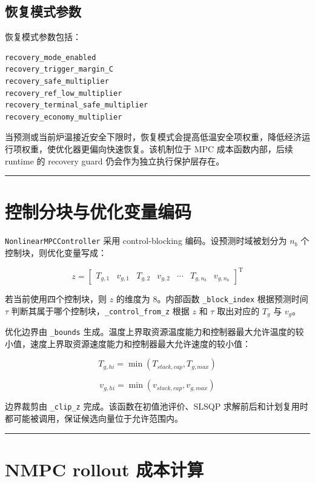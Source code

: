 \documentclass[UTF8,openany,zihao=-4,oneside]{ctexbook}
\providecommand{\passthrough}[1]{#1}
\newcommand{\manualdivider}{\par\vspace{0.6em}\noindent\textcolor{FGLine}{\rule{\linewidth}{0.7pt}}\vspace{0.6em}\par}
\begin{document}
\subsection{恢复模式参数}\label{subsec:nmpc-recovery-config}

恢复模式参数包括：

\begin{lstlisting}
recovery_mode_enabled
recovery_trigger_margin_C
recovery_safe_multiplier
recovery_ref_low_multiplier
recovery_terminal_safe_multiplier
recovery_economy_multiplier
\end{lstlisting}

当预测或当前炉温接近安全下限时，恢复模式会提高低温安全项权重，降低经济运行项权重，使优化器更偏向快速恢复。该机制位于 MPC 成本函数内部，后续 runtime 的 recovery guard 仍会作为独立执行保护层存在。

\manualdivider

\section{控制分块与优化变量编码}\label{sec:nmpc-block-encoding}

\passthrough{\lstinline!NonlinearMPCController!} 采用 control-blocking 编码。设预测时域被划分为 \(n_b\) 个控制块，则优化变量写成：

\[
z=
\begin{bmatrix}
T_{g,1} & v_{g,1} & T_{g,2} & v_{g,2} & \cdots & T_{g,n_b} & v_{g,n_b}
\end{bmatrix}^{\mathrm T}
\]

若当前使用四个控制块，则 \(z\) 的维度为 8。内部函数 \passthrough{\lstinline!_block_index!} 根据预测时间 \(\tau\) 判断其属于哪个控制块，\passthrough{\lstinline!_control_from_z!} 根据 \(z\) 和 \(\tau\) 取出对应的 \(T_g\) 与 \(v_g\)。

优化边界由 \passthrough{\lstinline!_bounds!} 生成。温度上界取资源温度能力和控制器最大允许温度的较小值，速度上界取资源速度能力和控制器最大允许速度的较小值：

\[
T_{g,hi}=\min(T_{stack,cap},T_{g,max})
\]

\[
v_{g,hi}=\min(v_{stack,cap},v_{g,max})
\]

边界裁剪由 \passthrough{\lstinline!_clip_z!} 完成。该函数在初值池评价、SLSQP 求解前后和计划复用时都可能被调用，保证候选向量位于允许范围内。

\manualdivider

\section{NMPC rollout 成本计算}\label{sec:nmpc-rollout-cost}
\end{document}
